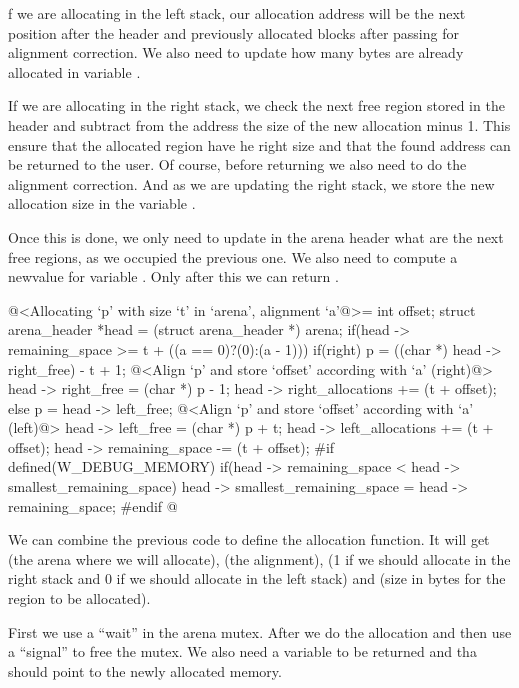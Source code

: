 f we are allocating in the left stack, our allocation address will be
the next position after the header and previously allocated blocks
after passing for alignment correction. We also need to update how
many bytes are already allocated in
variable .

If we are allocating in the right stack, we check the next free region
stored in the header and subtract from the address the size of the new
allocation minus 1. This ensure that the allocated region have he
right size and that the found address can be returned to the user. Of
course, before returning we also need to do the alignment
correction. And as we are updating the right stack, we store the new
allocation size in the variable .

Once this is done, we only need to update in the arena header what are
the next free regions, as we occupied the previous one. We also need
to compute a newvalue for variable . Only
after this we can return .

\iniciocodigo
@<Allocating `p' with size `t' in `arena', alignment `a'@>=
{
  int offset;
  struct arena_header *head = (struct arena_header *) arena;
  if(head -> remaining_space >= t + ((a == 0)?(0):(a - 1))){
    if(right){
      p = ((char *) head -> right_free) - t + 1;
      @<Align `p' and store `offset' according with `a' (right)@>
      head -> right_free = (char *) p - 1;
      head -> right_allocations += (t + offset);
    }
    else{
      p = head -> left_free;
      @<Align `p' and store `offset' according with `a' (left)@>
      head -> left_free = (char *) p + t;
      head -> left_allocations += (t + offset);
    }
    head -> remaining_space -= (t + offset);
#if defined(W_DEBUG_MEMORY)
    if(head -> remaining_space < head -> smallest_remaining_space)
      head -> smallest_remaining_space = head -> remaining_space;
#endif
  }
}
@
\fimcodigo


We can combine the previous code to define the allocation function. It
will get  (the arena where we will allocate),
 (the alignment),  (1 if we should
allocate in the right stack and 0 if we should allocate in the left
stack) and  (size in bytes for the region to be
allocated).

First we use a ``wait'' in the arena mutex. After we do the allocation
and then use a ``signal'' to free the mutex. We also need a
variable  to be returned and tha should point to the
newly allocated memory.

